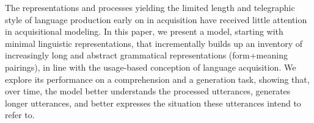 The representations and processes yielding the limited length and telegraphic style of language production early on in acquisition have received little attention in acquisitional modeling. In this paper, we present a model, starting with minimal linguistic representations, that incrementally builds up an inventory of increasingly long and abstract grammatical representations (form+meaning pairings), in line with the usage-based conception of language acquisition. We explore its performance on a comprehension and a generation task, showing that, over time, the model better understands the processed utterances, generates longer utterances, and better expresses the situation these utterances intend to refer to.
